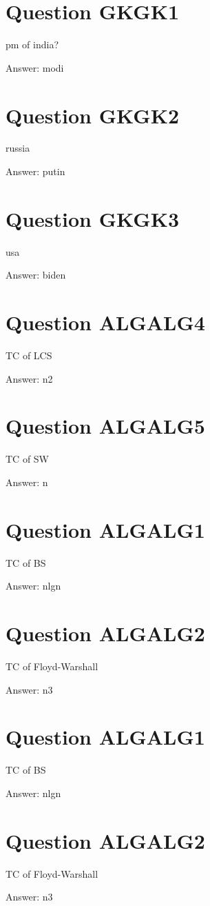

\section{Question GKGK1}

pm of india?

Answer: modi


\section{Question GKGK2}

russia

Answer: putin


\section{Question GKGK3}

usa

Answer: biden


\section{Question ALGALG4}

TC of LCS

Answer: n2


\section{Question ALGALG5}

TC of SW

Answer: n


\section{Question ALGALG1}

TC of BS

Answer: nlgn


\section{Question ALGALG2}

TC of Floyd-Warshall

Answer: n3


\section{Question ALGALG1}

TC of BS

Answer: nlgn


\section{Question ALGALG2}

TC of Floyd-Warshall

Answer: n3
